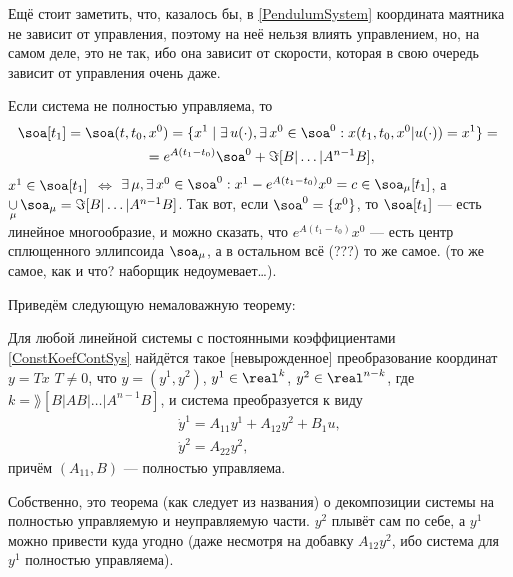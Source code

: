 {\begin{ex}
Ещё стоит заметить, что, казалось бы, в \eqref{PendulumSystem} координата маятника не зависит от управления, поэтому на неё нельзя влиять управлением, но, на самом деле, это не так, ибо она зависит от скорости, которая в свою очередь зависит от управления очень даже.
\end{ex}

Если система не полностью управляема, то
\begin{multline*}
	\soa[t_1] = \soa(t,t_0,x^0) = \{x^1 \mid \exists\, u(\cdot), \exists\, x^0 \in \soa^0 : x(t_1,t_0,x^0|u(\cdot)) = x^1 \}  ={}\\{}= e^{A(t_1 - t_0)}\soa^0 + \Im [B|\dots|A^{n-1}B],
\end{multline*}
$x^1 \in \soa[t_1]$ $\Leftrightarrow$ $\exists\,\mu, \exists\, x^0 \in \soa^0: x^1-e^{A(t_1-t_0)}x^0 = c \in \soa_\mu[t_1]$, а $\mathop{\cup}\limits_\mu \soa_\mu = \Im[B|\dots|A^{n-1}B]$.
Так вот, если $\soa^0 = \{x^0\}$, то $\soa[t_1]$ --- есть линейное многообразие, и можно сказать, что $e^{A(t_1-t_0)}x^0$ --- есть центр сплющенного эллипсоида $\soa_\mu$, а в остальном всё (???) то же самое. (то же самое, как и что? наборщик недоумевает\ldots).

Приведём следующую немаловажную теорему:
\begin{theorem}[о декомпозиции] %
Для любой линейной системы с постоянными коэффициентами \eqref{ConstKoefContSys}  найдётся такое [невырожденное] преобразование координат $y=Tx$ $T\not = 0$, что $y=(y^1,y^2)$, $y^1\in\real^k$, $y^2\in\real^{n-k}$, где $k=\rang[B|AB|\dots|A^{n-1}B]$, и система преобразуется к виду
\begin{equation*}
	\begin{array}{l}
		\dot{y}^1 = A_{11} y^1 + A_{12} y^2 + B_1 u, \\
		\dot{y}^2 = A_{22}y^2,
	\end{array}
\end{equation*}
причём $(A_{11},B)$ --- полностью управляема.
\end{theorem}
Собственно, это теорема (как следует из названия) о декомпозиции системы на полностью управляемую и неуправляемую части. $y^2$ \glqqq плывёт\grqqq{} сам по себе, а $y^1$ можно привести куда угодно (даже несмотря на добавку $A_{12}y^2$, ибо система для $y^1$ полностью управляема).

}
